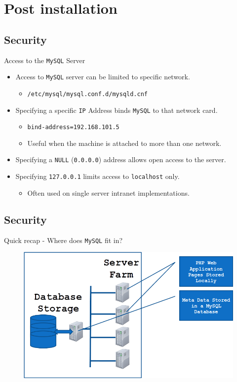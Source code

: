 \documentclass[xcolor=table]{beamer}
\begin{document}
\section{Post installation}
\subsection{Security}
\begin{frame}{Access to the \texttt{MySQL} Server}
  \begin{itemize}
    \item Access to \texttt{MySQL} server can be limited to specific network.
      \begin{itemize}
        \item \texttt{/etc/mysql/mysql.conf.d/mysqld.cnf}
      \end{itemize}
    \item Specifying a specific \texttt{IP} Address binds \texttt{MySQL} to that network card.
      \begin{itemize}
        \item \texttt{bind-address=192.168.101.5}
        \item Useful when the machine is attached to more than one network.
      \end{itemize}
    \item Specifying a \texttt{NULL} (\texttt{0.0.0.0}) address allows open access to the server.
    \item Specifying \texttt{127.0.0.1} limits access to \texttt{localhost} only.
      \begin{itemize}
        \item Often used on single server intranet implementations.
      \end{itemize}
  \end{itemize}
\end{frame}

\subsection{Security}
\begin{frame}{Quick recap - Where does \texttt{MySQL} fit in?}
  \begin{figure}
    \begin{center}
      \includegraphics[width=0.8\linewidth]{MySQLWhere.png}
    \end{center}
  \end{figure}
\end{frame}
\end{document}

